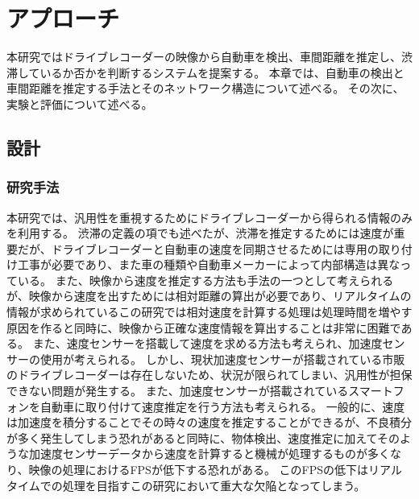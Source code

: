 \chapter{アプローチ}
本研究ではドライブレコーダーの映像から自動車を検出、車間距離を推定し、渋滞しているか否かを判断するシステムを提案する。
本章では、自動車の検出と車間距離を推定する手法とそのネットワーク構造について述べる。
その次に、実験と評価について述べる。

\section{設計}
\subsection{研究手法}
本研究では、汎用性を重視するためにドライブレコーダーから得られる情報のみを利用する。
渋滞の定義の項でも述べたが、渋滞を推定するためには速度が重要だが、ドライブレコーダーと自動車の速度を同期させるためには専用の取り付け工事が必要であり、また車の種類や自動車メーカーによって内部構造は異なっている。
また、映像から速度を推定する方法も手法の一つとして考えられるが、映像から速度を出すためには相対距離の算出が必要であり、リアルタイムの情報が求められているこの研究では相対速度を計算する処理は処理時間を増やす原因を作ると同時に、映像から正確な速度情報を算出することは非常に困難である。
また、速度センサーを搭載して速度を求める方法も考えられ、加速度センサーの使用が考えられる。
しかし、現状加速度センサーが搭載されている市販のドライブレコーダーは存在しないため、状況が限られてしまい、汎用性が担保できない問題が発生する。
また、加速度センサーが搭載されているスマートフォンを自動車に取り付けて速度推定を行う方法も考えられる。
一般的に、速度は加速度を積分することでその時々の速度を推定することができるが、不良積分が多く発生してしまう恐れがあると同時に、物体検出、速度推定に加えてそのような加速度センサーデータから速度を計算すると機械が処理するものが多くなり、映像の処理におけるFPSが低下する恐れがある。
このFPSの低下はリアルタイムでの処理を目指すこの研究において重大な欠陥となってしまう。

